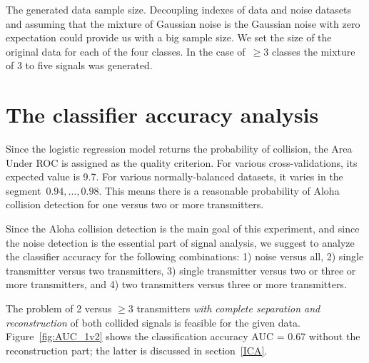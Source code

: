 \documentclass[12pt]{article}
\begin{document}
The generated data sample size. Decoupling indexes of data and noise datasets and assuming that the mixture of Gaussian noise is the Gaussian noise with zero expectation could provide us with a big sample size. We set the size of the original data for each of the four classes.  In the case of~$\geq 3$ classes the mixture of 3 to five signals was generated.

\section{The classifier accuracy analysis}

Since the logistic regression model returns the probability of collision, the Area Under ROC is assigned as the quality criterion. For various cross-validations, its expected value is 9.7. For various normally-balanced datasets, it varies in the segment~$0.94,\ldots,0.98$. This means there is a reasonable probability of Aloha collision detection for one versus two or more transmitters. 

Since the Aloha collision detection is the main goal of this experiment, and since the noise detection is the essential part of signal analysis, we suggest to analyze the classifier accuracy for the following combinations:
1) noise versus all, 2) single transmitter versus two transmitters, 3) single transmitter versus two or three or more transmitters, and 4) two transmitters versus three or more transmitters. 

The problem of 2 versus $\geq 3$ transmitters \emph{with complete separation and reconstruction} of both collided signals is feasible for the given data. Figure~\ref{fig:AUC_1v2} shows the classification accuracy AUC = 0.67 without the reconstruction part; the latter is discussed in section~\ref{ICA}.
\end{document}
